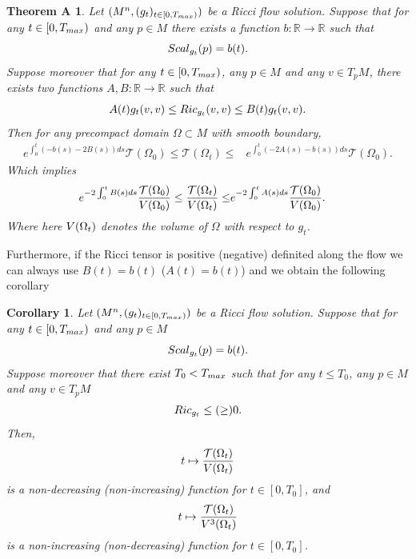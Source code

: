 \documentclass{amsart}
\newtheorem*{samelettertheoremA}{ Theorem A}
\newtheorem{corollary}[theorem]{Corollary}
\theoremstyle{definition}
\theoremstyle{remark}
\newcommand{\Ric}{{\rm Ric}}
\newcommand{\V}{{\rm V}}
\begin{document}
\begin{samelettertheoremA}Let $(M^n,(g_t)_{t\in [0,T_{\rm max})})$ be a Ricci flow solution. Suppose that for any $t\in [0,T_{\rm max})$ and any $p\in M$ there exists a function $b:\mathbb{R}\to\mathbb{R}$ such that
$$
 {\rm Scal}_{g_t}(p)=b(t).
$$
Suppose moreover that for any $t\in [0,T_{\rm max})$, any $p\in M$ and any $v\in T_pM$, there exists two functions $A,B:\mathbb{R}\to\mathbb{R}$ such that 
$$
A(t)g_t(v,v)\leq {\rm Ric}_{g_t}(v,v)\leq B(t)g_t(v,v). 
$$
Then for any precompact domain $\Omega\subset M$ with smooth boundary,
$$
\begin{aligned}
 e^{\int_0^t\left(-b(s)-2B(s)\right)ds}\mathcal{T}(\Omega_0)\leq\mathcal{T}(\Omega_t)\leq& e^{\int_0^t\left(-2A(s)-b(s)\right)ds}\mathcal{T}(\Omega_0). 
\end{aligned}
$$
Which implies
$$
\begin{aligned}
 e^{-2\int_0^tB(s)ds}\frac{\mathcal{T}(\Omega_0)}{\V(\Omega_0)}\leq\frac{\mathcal{T}(\Omega_t)}{\V(\Omega_t)}\leq& e^{-2\int_0^tA(s)ds}\frac{\mathcal{T}(\Omega_0)}{\V(\Omega_0)}. 
\end{aligned}
$$
Where here  ${\rm V}(\Omega_t)$ denotes the volume of $\Omega$ with respect to $g_t$.
\end{samelettertheoremA}

Furthermore, if the Ricci tensor is positive (negative) definited  along the flow we can always use $B(t)=b(t)$ ($A(t)=b(t)$) and we obtain the following corollary  
\begin{corollary}\label{cor:Ric}
    Let $(M^n,(g_t)_{t\in [0,T_{\rm max})})$ be a Ricci flow solution. Suppose that for any $t\in [0,T_{\rm max})$ and any $p\in M$
$$
 {\rm Scal}_{g_t}(p)=b(t).
$$
Suppose moreover that there exist $T_0<T_{\rm max}$ such that for any $t\leq T_0$, any $p\in M$ and any $v\in T_pM$
$$
\Ric_{g_t}\leq(\geq) 0.
$$
Then,
$$
t\mapsto \frac{\mathcal{T}(\Omega_t)}{\V(\Omega_t)}
$$
is a non-decreasing (non-increasing) function for $t\in [0,T_0]$, and 
$$
t\mapsto \frac{\mathcal{T}(\Omega_t)}{\V^3(\Omega_t)}
$$
is a non-increasing (non-decreasing) function for $t\in [0,T_0]$.
\end{corollary}
\end{document}
